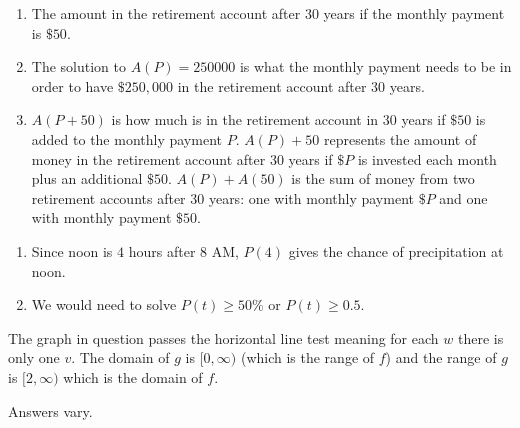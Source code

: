 \begin{exenum}
\begin{enumerate}
\item The amount in the retirement account after 30 years if the monthly payment is $\$50$.

\item  The solution to $A(P) = 250000$ is what the monthly payment needs to be in order to have $\$250,\!000$ in the retirement account after 30 years.

\item  $A(P+50)$ is how much is in the retirement account in 30 years if $\$ 50$ is added to the monthly payment $P$.  $A(P)+50$ represents the amount of money in the retirement account after 30 years if $\$P$  is invested each month plus an additional $\$50$.  $A(P)+A(50)$ is the sum of money from two retirement accounts after 30 years: one with monthly payment $\$P$ and one with monthly payment $\$50$.

\end{enumerate}

\item  

\begin{enumerate}

\item  Since noon is $4$ hours after 8 AM, $P(4)$ gives the chance of precipitation at noon.

\item  We would need to solve $P(t) \geq 50 \%$ or $P(t) \geq 0.5$.

\end{enumerate}


\item The graph in question passes the horizontal line test meaning for each $w$ there is only one $v$.    The domain of $g$ is $[0, \infty)$ (which is the range of $f$) and the range of $g$ is $[2, \infty)$ which is the domain of $f$.  

\item  Answers vary.  

\end{exenum}
